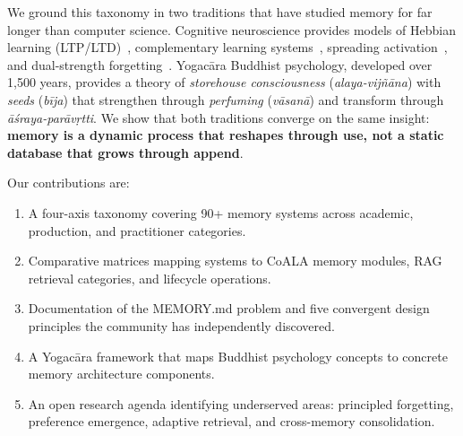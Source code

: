 We ground this taxonomy in two traditions that have studied memory for
far longer than computer science. Cognitive neuroscience provides
models of Hebbian learning (LTP/LTD)~\cite{hebb1949, bliss1973},
complementary learning systems~\cite{mcclelland1995}, spreading
activation~\cite{collins1975}, and dual-strength
forgetting~\cite{bjork1992}. Yogac\=ara Buddhist psychology, developed
over 1,500 years, provides a theory of \emph{storehouse consciousness}
(\emph{alaya-vij\~n\=ana}) with \emph{seeds} (\emph{b\=ija}) that
strengthen through \emph{perfuming} (\emph{v\=asan\=a}) and transform
through \emph{\=a\'sraya-par\=av\d{r}tti}. We show that both
traditions converge on the same insight: \textbf{memory is a dynamic
process that reshapes through use, not a static database that grows
through append}.

Our contributions are:
\begin{enumerate}[leftmargin=*, nosep]
    \item A four-axis taxonomy covering 90+ memory systems across
    academic, production, and practitioner categories.
    \item Comparative matrices mapping systems to CoALA memory
    modules, RAG retrieval categories, and lifecycle operations.
    \item Documentation of the MEMORY.md problem and five convergent
    design principles the community has independently discovered.
    \item A Yogac\=ara framework that maps Buddhist psychology concepts
    to concrete memory architecture components.
    \item An open research agenda identifying underserved areas:
    principled forgetting, preference emergence, adaptive retrieval,
    and cross-memory consolidation.
\end{enumerate}
